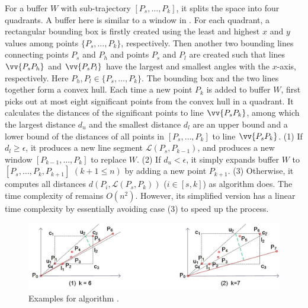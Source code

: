 For a buffer $W$ with sub-trajectory $[P_s, \ldots, P_k]$, it splits the space into four quadrants. A buffer here is similar to a window in \opwa \cite{Meratnia:Spatiotemporal}. For each quadrant, a rectangular bounding box is firstly created using the least and highest $x$ and $y$ values among points $\{P_s,\ldots,P_k\}$, respectively. Then another two bounding lines connecting points $P_s$ and $P_{h}$ and points $P_s$ and $P_{l}$ are created such that lines $\vv{P_sP_{h}}$ and $\vv{P_sP_{l}}$ have the largest and smallest angles with the $x$-axis, respectively.
Here $P_{h},P_{l} \in\{P_s,\ldots,P_k\}$. The bounding box and the two lines together form a convex hull.
Each time a new point $P_k$ is added to buffer $W$, \bqsa first picks out at most eight significant points from the convex hull in a quadrant. It calculates the distances of the significant points to line $\vv{P_sP_k}$, among which the largest distance $d_{u}$ and the smallest distance $d_l$ are an upper bound and  a lower bound of the distances of all points in $[P_s, \ldots, P_k]$ to line $\vv{P_sP_k}$.
(1) If $d_l\ge \epsilon$, it produces a new line segment $\mathcal{L}(P_{s}, P_{k-1})$, and produces a new window $[P_{k-1},\ldots,P_{k}]$ to replace $W$.
(2) If $d_u < \epsilon$, it simply expands buffer $W$ to $[P_s, \ldots, P_k, P_{k+1}]$ $(k+1\le n)$ by adding a new point $P_{k+1}$.
(3) Otherwise, it computes all distances $d(P_i, {\mathcal{L}(P_s,P_k)})$ ($i\in[s, k]$) as algorithm \dpa does.
%
The time complexity of \bqsa remains $O(n^2)$. However, its simplified version \fbqsa has a linear time complexity by essentially avoiding case (3) to speed up the process.

\begin{figure}[tb!]
	\centering
	\includegraphics[scale = 0.66]{Figures/Fig-BQS.jpg}
	\vspace{-2ex}
	\caption{{\small Examples for algorithm \bqsa.}}
	\label{fig:bqs}
	\vspace{-1ex}
\end{figure}


